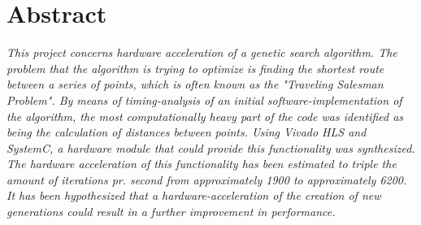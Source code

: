 
\chapter*{Abstract}
\textit{This project concerns hardware acceleration of a genetic search algorithm. The problem that the algorithm is trying to optimize is finding the shortest route between a series of points, which is often known as the "Traveling Salesman Problem"\cite{wiki:TSP}. By means of timing-analysis of an initial software-implementation of the algorithm, the most computationally heavy part of the code was identified as being the calculation of distances between points. Using Vivado HLS and SystemC, a hardware module that could provide this functionality was synthesized. The hardware acceleration of this functionality has been estimated to triple the amount of iterations pr. second from approximately 1900 to approximately 6200. It has been hypothesized that a hardware-acceleration of the creation of new generations could result in a further improvement in performance.}